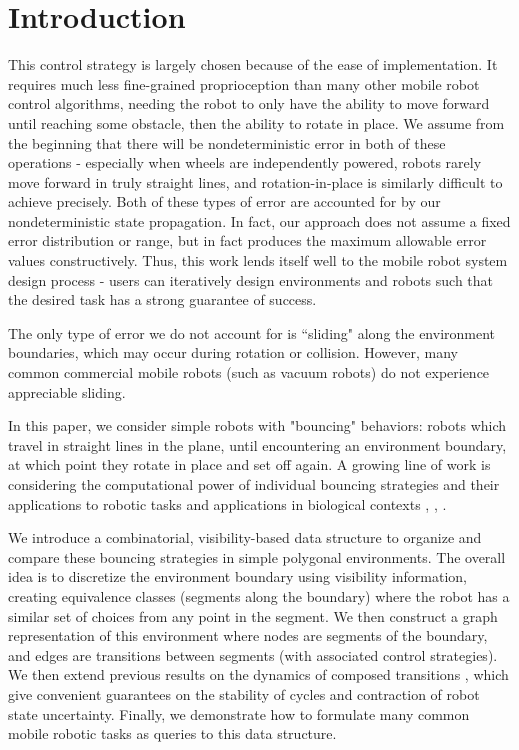 \documentclass[]{svproc}  %
\begin{document}
\section{Introduction} 

This control strategy is largely chosen because of the ease of implementation.
It requires much less fine-grained proprioception than many other mobile robot
control algorithms, needing the robot to only have the ability to move forward
until reaching some obstacle, then the ability to rotate in place. We assume
from the beginning that there will be nondeterministic error in both of these
operations - especially when wheels are independently powered, robots rarely
move forward in truly straight lines, and rotation-in-place is similarly
difficult to achieve precisely. Both of these types of error are accounted for
by our nondeterministic state propagation. In fact, our approach does not assume
a fixed error distribution or range, but in fact produces the maximum allowable
error values constructively. Thus, this work lends itself well to the mobile
robot system design process - users can iteratively design environments and
robots such that the desired task has a strong guarantee of success.

The only type of error we do not
account for is ``sliding" along the environment boundaries, which may occur
during rotation or collision. However, many common commercial mobile robots
(such as vacuum robots) do not experience appreciable sliding.

In this paper, we consider simple robots with "bouncing" behaviors: robots which
travel in straight lines in the plane, until encountering an environment
boundary, at which point they rotate in place and set off again. A growing line
of work is considering the computational power of individual bouncing strategies
and their applications to robotic tasks and applications in biological contexts
\cite{ErLav13}, \cite{microorganism2017}, \cite{alam2017minimalist}.

We introduce a combinatorial, visibility-based data structure to organize and
compare these bouncing strategies in simple polygonal environments. The overall
idea is to discretize the environment boundary using visibility information,
creating equivalence classes (segments along the boundary) where the robot has a
similar set of choices from any point in the segment. We then construct a graph
representation of this environment where nodes are segments of the boundary, and
edges are transitions between segments (with associated control strategies). We
then extend previous results on the dynamics of composed transitions
\cite{NilBecLav17}, which give convenient guarantees on the stability of cycles
and contraction of robot state uncertainty. Finally, we demonstrate how to
formulate many common mobile robotic tasks as queries to this data structure.
\end{document}
